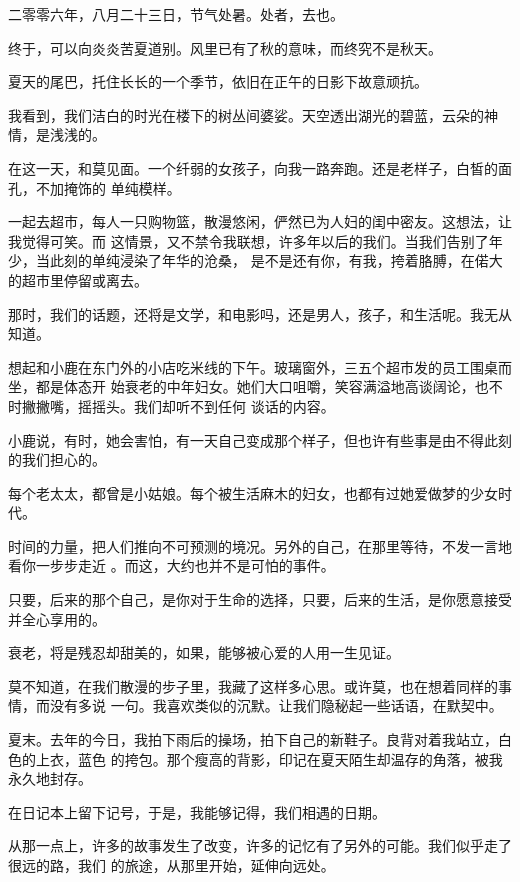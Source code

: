 \documentclass[12pt,a4paper]{article}
\begin{document}
	\endwriting



		二零零六年，八月二十三日，节气处暑。处者，去也。\par
		终于，可以向炎炎苦夏道别。风里已有了秋的意味，而终究不是秋天。\par
		夏天的尾巴，托住长长的一个季节，依旧在正午的日影下故意顽抗。\par
		我看到，我们洁白的时光在楼下的树丛间婆娑。天空透出湖光的碧蓝，云朵的神情，是浅浅的。

		在这一天，和莫见面。一个纤弱的女孩子，向我一路奔跑。还是老样子，白皙的面孔，不加掩饰的
	单纯模样。

		一起去超市，每人一只购物篮，散漫悠闲，俨然已为人妇的闺中密友。这想法，让我觉得可笑。而
	这情景，又不禁令我联想，许多年以后的我们。当我们告别了年少，当此刻的单纯浸染了年华的沧桑，
	是不是还有你，有我，挎着胳膊，在偌大的超市里停留或离去。

		那时，我们的话题，还将是文学，和电影吗，还是男人，孩子，和生活呢。我无从知道。

		想起和小鹿在东门外的小店吃米线的下午。玻璃窗外，三五个超市发的员工围桌而坐，都是体态开
	始衰老的中年妇女。她们大口咀嚼，笑容满溢地高谈阔论，也不时撇撇嘴，摇摇头。我们却听不到任何
	谈话的内容。

		小鹿说，有时，她会害怕，有一天自己变成那个样子，但也许有些事是由不得此刻的我们担心的。

		每个老太太，都曾是小姑娘。每个被生活麻木的妇女，也都有过她爱做梦的少女时代。

		时间的力量，把人们推向不可预测的境况。另外的自己，在那里等待，不发一言地看你一步步走近
	。而这，大约也并不是可怕的事件。

		只要，后来的那个自己，是你对于生命的选择，只要，后来的生活，是你愿意接受并全心享用的。

		衰老，将是残忍却甜美的，如果，能够被心爱的人用一生见证。

		莫不知道，在我们散漫的步子里，我藏了这样多心思。或许莫，也在想着同样的事情，而没有多说
	一句。我喜欢类似的沉默。让我们隐秘起一些话语，在默契中。

		夏末。去年的今日，我拍下雨后的操场，拍下自己的新鞋子。良背对着我站立，白色的上衣，蓝色
	的挎包。那个瘦高的背影，印记在夏天陌生却温存的角落，被我永久地封存。

		在日记本上留下记号，于是，我能够记得，我们相遇的日期。

		从那一点上，许多的故事发生了改变，许多的记忆有了另外的可能。我们似乎走了很远的路，我们
	的旅途，从那里开始，延伸向远处。
\end{document}
